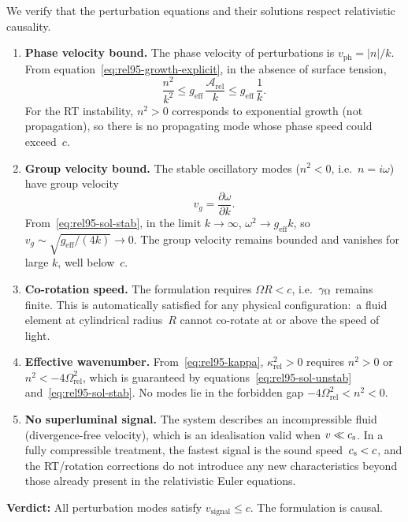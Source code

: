 \begin{causalitycheck}
We verify that the perturbation equations and their solutions respect
relativistic causality.

\begin{enumerate}
\item \textbf{Phase velocity bound.}  The phase velocity of
  perturbations is $v_{\mathrm{ph}} = |n|/k$.  From
  equation~\eqref{eq:rel95-growth-explicit}, in the absence of
  surface tension,
  \begin{equation}
    \frac{n^{2}}{k^{2}}
      \leq g_{\mathrm{eff}}\,\frac{\mathcal{A}_{\mathrm{rel}}}{k}
      \leq g_{\mathrm{eff}}\,\frac{1}{k}.
  \end{equation}
  For the RT instability, $n^{2}>0$ corresponds to exponential growth
  (not propagation), so there is no propagating mode whose phase speed
  could exceed~$c$.

\item \textbf{Group velocity bound.}  The stable oscillatory modes
  ($n^{2}<0$, i.e.\ $n=i\omega$) have group velocity
  \begin{equation}
    v_{g} = \frac{\partial\omega}{\partial k}.
  \end{equation}
  From~\eqref{eq:rel95-sol-stab}, in the limit $k\to\infty$,
  $\omega^{2}\to g_{\mathrm{eff}}k$, so
  $v_{g}\sim\sqrt{g_{\mathrm{eff}}/(4k)}\to 0$.  The group velocity
  remains bounded and vanishes for large $k$, well below~$c$.

\item \textbf{Co-rotation speed.}  The formulation requires
  $\Omega R < c$, i.e.\ $\gamma_{\Omega}$ remains finite.  This is
  automatically satisfied for any physical configuration:\ a fluid
  element at cylindrical radius~$R$ cannot co-rotate at or above
  the speed of light.

\item \textbf{Effective wavenumber.}  From~\eqref{eq:rel95-kappa},
  $\kappa_{\mathrm{rel}}^{2}>0$ requires
  $n^{2}>0$ or $n^{2}<-4\Omega_{\mathrm{rel}}^{2}$, which is
  guaranteed by equations~\eqref{eq:rel95-sol-unstab}
  and~\eqref{eq:rel95-sol-stab}.  No modes lie in the forbidden gap
  $-4\Omega_{\mathrm{rel}}^{2}<n^{2}<0$.

\item \textbf{No superluminal signal.}  The system describes an
  incompressible fluid (divergence-free velocity), which is an
  idealisation valid when $v\ll c_{\mathrm{s}}$.  In a fully compressible
  treatment, the fastest signal is the sound speed~$c_{\mathrm{s}}<c$, and the
  RT/rotation corrections do not introduce any new characteristics
  beyond those already present in the relativistic Euler equations.
\end{enumerate}

\textbf{Verdict:} All perturbation modes satisfy $v_{\mathrm{signal}}
\leq c$.  The formulation is causal.
\end{causalitycheck}

